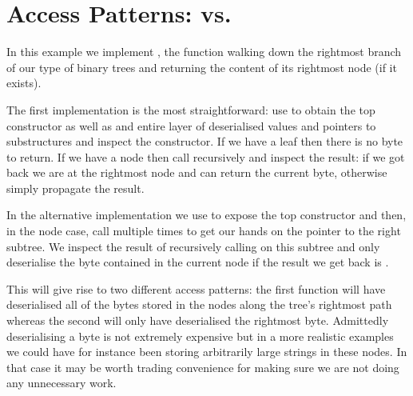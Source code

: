 \section{Access Patterns:  vs. }\label{appendix:rightmost}

In this example we implement , the function walking
down the rightmost branch of our type of binary trees and returning the
content of its rightmost node (if it exists).

The first implementation is the most straightforward: use 
to obtain the top constructor as well as and entire layer of deserialised values
and pointers to substructures and inspect the constructor.
%
If we have a leaf then there is no byte to return.
%
If we have a node then call  recursively and inspect the
result: if we got  back we are at the rightmost node and can
return the current byte, otherwise simply propagate the result.


In the alternative implementation we use  to expose the top
constructor and then, in the node case, call  multiple times
to get our hands on the pointer to the right subtree.
%
We inspect the result of recursively calling  on this
subtree and only deserialise the byte contained in the current node if the result
we get back is .


This will give rise to two different access patterns: the first function will
have deserialised all of the bytes stored in the nodes along the tree's
rightmost path whereas the second will only have deserialised the rightmost byte.
%
Admittedly deserialising a byte is not extremely expensive but in a more realistic
examples we could have for instance been storing arbitrarily large strings in
these nodes. In that case it may be worth trading convenience for making sure we
are not doing any unnecessary work.
